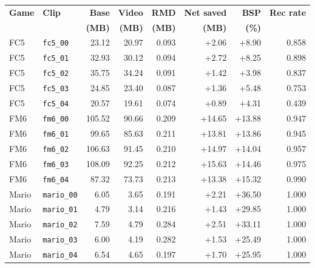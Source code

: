 \begin{tabular}{@{}llrrrrrr@{}}
\toprule
\textbf{Game} & \textbf{Clip} & \textbf{Base} & \textbf{Video} & \textbf{RMD} & \textbf{Net saved} & \textbf{BSP} & \textbf{Rec rate} \\
 & & \textbf{(MB)} & \textbf{(MB)} & \textbf{(MB)} & \textbf{(MB)} & \textbf{(\%)} & \\
\midrule
FC5 & \texttt{fc5\_00} & 23.12 & 20.97 & 0.093 & +2.06 & +8.90 & 0.858 \\
FC5 & \texttt{fc5\_01} & 32.93 & 30.12 & 0.094 & +2.72 & +8.25 & 0.898 \\
FC5 & \texttt{fc5\_02} & 35.75 & 34.24 & 0.091 & +1.42 & +3.98 & 0.837 \\
FC5 & \texttt{fc5\_03} & 24.85 & 23.40 & 0.087 & +1.36 & +5.48 & 0.753 \\
FC5 & \texttt{fc5\_04} & 20.57 & 19.61 & 0.074 & +0.89 & +4.31 & 0.439 \\
\midrule
FM6 & \texttt{fm6\_00} & 105.52 & 90.66 & 0.209 & +14.65 & +13.88 & 0.947 \\
FM6 & \texttt{fm6\_01} & 99.65 & 85.63 & 0.211 & +13.81 & +13.86 & 0.945 \\
FM6 & \texttt{fm6\_02} & 106.63 & 91.45 & 0.210 & +14.97 & +14.04 & 0.957 \\
FM6 & \texttt{fm6\_03} & 108.09 & 92.25 & 0.212 & +15.63 & +14.46 & 0.975 \\
FM6 & \texttt{fm6\_04} & 87.32 & 73.73 & 0.213 & +13.38 & +15.32 & 0.990 \\
\midrule
Mario & \texttt{mario\_00} & 6.05 & 3.65 & 0.191 & +2.21 & +36.50 & 1.000 \\
Mario & \texttt{mario\_01} & 4.79 & 3.14 & 0.216 & +1.43 & +29.85 & 1.000 \\
Mario & \texttt{mario\_02} & 7.59 & 4.79 & 0.284 & +2.51 & +33.11 & 1.000 \\
Mario & \texttt{mario\_03} & 6.00 & 4.19 & 0.282 & +1.53 & +25.49 & 1.000 \\
Mario & \texttt{mario\_04} & 6.54 & 4.65 & 0.197 & +1.70 & +25.95 & 1.000 \\
\bottomrule
\end{tabular}
